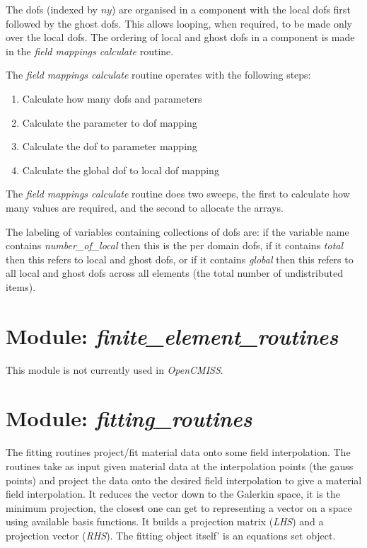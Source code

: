 The dofs (indexed by $ny$) are organised in a component with the local dofs
first followed by the ghost dofs. This allows looping, when required, to be made 
only over the local dofs. The ordering of local and ghost dofs in a component is
made in the \emph{field mappings calculate} routine.

The \emph{field mappings calculate} routine operates with the following steps:

\begin{enumerate}
 \item Calculate how many dofs and parameters
 \item Calculate the parameter to dof mapping
 \item Calculate the dof to parameter mapping
 \item Calculate the global dof to local dof mapping
\end{enumerate}

The \emph{field mappings calculate} routine does two sweeps, the first to
calculate how many values are required, and the second to allocate the arrays.

The labeling of variables containing collections of dofs are: if the variable 
name contains \emph{number\_of\_local} then this is the per domain dofs, if it 
contains \emph{total} then this refers to local and ghost dofs, or if it 
contains \emph{global} then this refers to all local and ghost dofs across all 
elements (the total number of undistributed items).


\section{Module: \emph{finite\_element\_routines}}
\label{sec:finiteelementroutines}

This module is not currently used in \emph{OpenCMISS}.


\section{Module: \emph{fitting\_routines}}
\label{sec:fittingroutines}

The fitting routines project/fit material data onto some field interpolation.
The routines take as input given material data at the interpolation points (the
gauss points) and project the data onto the desired field interpolation to give
a material field interpolation. It reduces the vector down to the Galerkin
space, it is the minimum projection, the closest one can get to representing a 
vector on a space using available basis functions. It builds a projection matrix 
(\emph{LHS}) and a projection vector (\emph{RHS}). The fitting object itself' 
is an equations set object.


